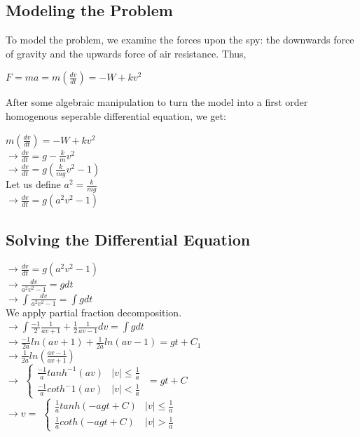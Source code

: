 \documentclass{article}
\begin{document}
	\subsection{Modeling the Problem}
	To model the problem, we examine the forces upon the spy: the downwards force of gravity and the upwards force of air resistance. Thus,
	\begin{center}
		$F=ma=m\left(\frac{dv}{dt}\right) = -W + kv^2$
	\end{center}
	After some algebraic manipulation to turn the model into a first order homogenous seperable differential equation, we get:
	\begin{center}
	$m\left(\frac{dv}{dt}\right) = -W 
	+ kv^2$ \\
	$\rightarrow \frac{dv}{dt} = g-\frac{k}{m}v^2$ \\
	$\rightarrow \frac{dv}{dt} = g(\frac{k}{mg}v^2 - 1)$\\
	Let us define $a^2 = \frac{k}{mg}$\\
	$\rightarrow \frac{dv}{dt} = g(a^2v^2 - 1)$
	\end{center}
	\subsection{Solving the Differential Equation}
	\begin{center}
	$\rightarrow \frac{dv}{dt} = g(a^2v^2 - 1)$ \\
	$\rightarrow \frac{dv}{a^2v^2 - 1} = gdt$ \\
	$\rightarrow \int \frac{dv}{a^2v^2 - 1} = \int gdt$ \\
	We apply partial fraction decomposition.\\
	$\rightarrow \int \frac{-1}{2}\frac{1}{av+1}+\frac{1}{2}\frac{1}{av-1} dv= \int gdt$\\
	$\rightarrow \frac{-1}{2a}ln(av+1)+\frac{1}{2a}ln(av-1) = gt+C_1$\\
	$\rightarrow \frac{1}{2a}ln\left(\frac{av-1}{av+1}\right)$ \\
	$\rightarrow$
	$\begin{cases}
		\frac{-1}{a}tanh^{-1}(av) & |v| \le \frac{1}{a} \\
		\frac{-1}{a}coth^-1(av) &|v| <  \frac{1}{a}
	\end{cases}$
	$=gt+C$\\
	$\rightarrow v=$
	$\begin{cases}
			\frac{1}{a} tanh(-agt+C) & |v|\le \frac{1}{a} \\
			\frac{1}{a} coth(-agt+C) &|v| >  \frac{1}{a}
		\end{cases}$
	\end{center}
\end{document}
